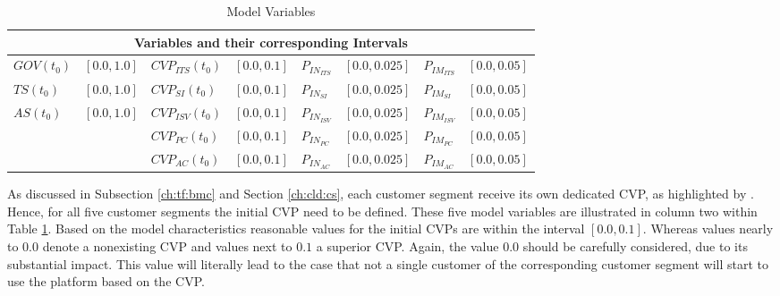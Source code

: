 \begin{table}[t]
	\centering
	\begin{tabular}{llllllll}
		\toprule 
		\multicolumn{8}{c}{\footnotesize \textbf{Variables and their corresponding Intervals}} \\ \midrule
		\footnotesize $GOV(t_0)$ & \footnotesize $[0.0,1.0]$ & \footnotesize $CVP_{ITS}(t_0)$ & \footnotesize $[0.0,0.1]$ & \footnotesize $P_{IN_{ITS}}$ & \footnotesize $[0.0,0.025]$ & \footnotesize $P_{IM_{ITS}}$ & \footnotesize $[0.0,0.05]$ \\
		\footnotesize $TS(t_0)$ & \footnotesize $[0.0,1.0]$ & \footnotesize $CVP_{SI}(t_0)$ & \footnotesize $[0.0,0.1]$ & \footnotesize $P_{IN_{SI}}$ & \footnotesize $[0.0,0.025]$ & \footnotesize $P_{IM_{SI}}$ & \footnotesize $[0.0,0.05]$ \\
		\footnotesize $AS(t_0)$ & \footnotesize $[0.0,1.0]$ & \footnotesize $CVP_{ISV}(t_0)$ & \footnotesize $[0.0,0.1]$ & \footnotesize $P_{IN_{ISV}}$ & \footnotesize $[0.0,0.025]$ & \footnotesize $P_{IM_{ISV}}$ & \footnotesize $[0.0,0.05]$ \\
		& & \footnotesize $CVP_{PC}(t_0)$ & \footnotesize $[0.0,0.1]$ & \footnotesize $P_{IN_{PC}}$ & \footnotesize $[0.0,0.025]$ & \footnotesize $P_{IM_{PC}}$ & \footnotesize $[0.0,0.05]$ \\
		& & \footnotesize $CVP_{AC}(t_0)$ & \footnotesize $[0.0,0.1]$ & \footnotesize $P_{IN_{AC}}$ & \footnotesize $[0.0,0.025]$ & \footnotesize $P_{IM_{AC}}$ & \footnotesize $[0.0,0.05]$ \\ \bottomrule
	\end{tabular}
	\caption{Model Variables}
	\label{tab:mvar}
\end{table}

\setlength{\tabcolsep}{\originalTabcolsep}

As discussed in Subsection \ref{ch:tf:bmc} and Section \ref{ch:cld:cs}, each customer segment receive its own dedicated \ac{CVP}, as highlighted by \citet{Johnson2008}. Hence, for all five customer segments the initial \ac{CVP} need to be defined. These five model variables are illustrated in column two within Table \ref{tab:mvar}. Based on the model characteristics reasonable values for the initial \acp{CVP} are within the interval $[0.0,0.1]$. Whereas  values nearly to $0.0$ denote a nonexisting \ac{CVP} and values next to $0.1$ a superior \ac{CVP}. Again, the value $0.0$ should be carefully considered, due to its substantial impact. This value will literally lead to the case that not a single customer of the corresponding customer segment will start to use the platform based on the \ac{CVP}.

